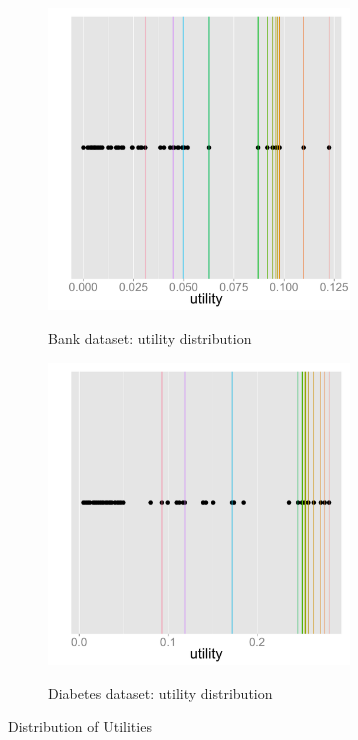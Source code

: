 \begin{figure}[h]
	\centering
	\begin{subfigure}{1\linewidth}
		\centering
		{\includegraphics[trim = 0mm 60mm 0mm 60mm, clip, width=8cm]
		{Images/bank_utility_distribution.pdf}}
		\caption{Bank dataset: utility distribution}
		\label{fig:bank_utility_distribution}
	\end{subfigure}
	
	\begin{subfigure}{1\linewidth}
		\centering
		{\includegraphics[trim = 0mm 60mm 0mm 60mm, clip, width=8cm]
		{Images/diabetes_utility_distribution.pdf}}
		\caption{Diabetes dataset: utility distribution}
		\label{fig:diabetes_utility_distribution}
	\end{subfigure}
\label{fig:utility_distribution}
\caption{Distribution of Utilities }
\end{figure}


